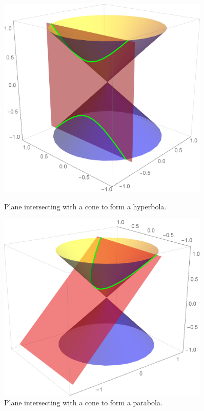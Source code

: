 \documentclass[letterpaper, 11pt, openany]{book}
\theoremstyle{mytheoremstyle}
\theoremstyle{myexamplestyle}
\begin{document}
\begin{figure}[htbp]
    \centering
    \begin{minipage}{0.45\textwidth}
        \centering
        \includegraphics[width=0.9\textwidth]{Figures/conichyperbola.png}
        \caption{Plane intersecting with a cone to form a hyperbola.}
        \label{f:conichyperbola}
    \end{minipage}\hfill
    \begin{minipage}{0.45\textwidth}
        \centering
        \includegraphics[width=0.9\textwidth]{Figures/conicparabola.png}
        \caption{Plane intersecting with a cone to form a parabola.}
        \label{f:conicparabola}
    \end{minipage}\hfill
\end{figure}
\end{document}
